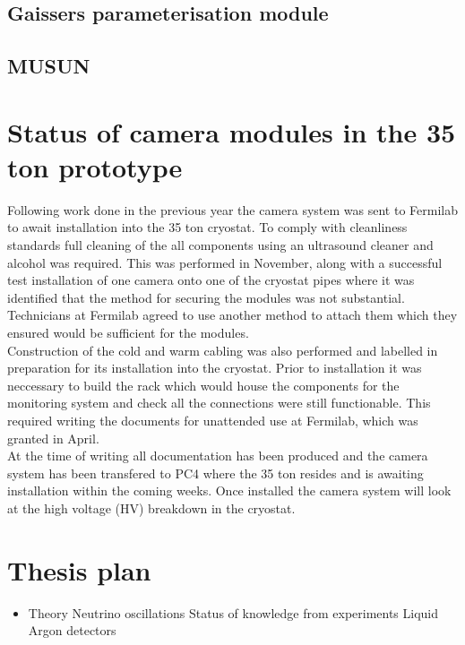 \documentclass[11pt]{report} %
\begin{document}
{\subsection{Gaissers parameterisation module}


\subsection{MUSUN}



\section{Status of camera modules in the 35 ton prototype}
Following work done in the previous year the camera system was sent to Fermilab to await installation into the 35 ton cryostat. To comply with cleanliness standards full cleaning of the all components using an ultrasound cleaner and alcohol was required. This was performed in November, along with a successful test installation of one camera onto one of the cryostat pipes where it was identified that the method for securing the modules was not substantial. Technicians at Fermilab agreed to use another method to attach them which they ensured would be sufficient for the modules. \\

Construction of the cold and warm cabling was also performed and labelled in preparation for its installation into the cryostat. Prior to installation it was neccessary to build the rack which would house the components for the monitoring system and check all the connections were still functionable. This required writing the documents for unattended use at Fermilab, which was granted in April. \\

At the time of writing all documentation has been produced and the camera system has been transfered to PC4 where the 35 ton resides and is awaiting installation within the coming weeks. Once installed the camera system will look at the high voltage (HV) breakdown in the cryostat. 

\newpage

\section{Thesis plan}
\begin{itemize}

\item Theory
  \subitem Neutrino oscillations
  \subitem Status of knowledge from experiments
  \subitem Liquid Argon detectors


\end{itemize}}
\end{document}
